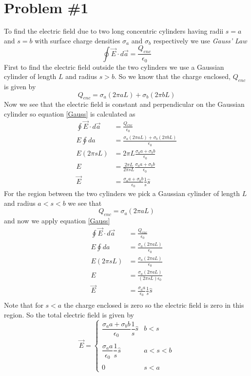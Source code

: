 \documentclass[11pt]{article}
\numberwithin{equation}{section}
\begin{document}


\section{Problem \#1}
To find the electric field due to two long concentric cylinders having radii $s=a$ and $s=b$ with surface charge densities $\sigma_a$ and $\sigma_b$ respectively we use \emph{Gauss' Law}
\begin{equation}
\oint\vec{E}\cdot d\vec{a} = \frac{Q_{enc}}{\epsilon_0}
\label{Gauss}
\end{equation}
First to find the electric field outside the two cylinders we use a Gaussian cylinder of length $L$ and radius $s>b$. So we know that the charge enclosed, $Q_{enc}$ is given by
$$Q_{enc} = \sigma_a(2\pi aL)+\sigma_b(2\pi bL)$$
Now we see that the electric field is constant and perpendicular on the Gaussian cylinder so equation \ref{Gauss} is calculated as
\begin{align*}
\oint\vec{E}\cdot d\vec{a} &= \frac{Q_{enc}}{\epsilon_0}\\
E\oint da &= \frac{\sigma_a(2\pi aL)+\sigma_b(2\pi bL)}{\epsilon_0}\\
E(2\pi sL) &= 2\pi L\frac{\sigma_aa+\sigma_bb}{\epsilon_0}\\
E &= \frac{2\pi L}{2\pi sL}\frac{\sigma_aa+\sigma_bb}{\epsilon_0}\\
\vec{E} &= \frac{\sigma_aa+\sigma_bb}{\epsilon_0}\frac{1}{s}\hat{s}
\end{align*}
For the region between the two cylinders we pick a Gaussian cylinder of length $L$ and radius $a<s<b$ we see that
$$Q_{enc} = \sigma_a(2\pi aL)$$
and now we apply equation \ref{Gauss}
\begin{align*}
\oint\vec{E}\cdot d\vec{a} &= \frac{Q_{enc}}{\epsilon_0}\\
E\oint da &= \frac{\sigma_a(2\pi aL)}{\epsilon_0}\\
E(2\pi sL) &= \frac{\sigma_a(2\pi aL)}{\epsilon_0}\\
E &= \frac{\sigma_a(2\pi aL)}{(2\pi sL)\epsilon_0}\\
\vec{E} &= \frac{\sigma_aa}{\epsilon_0}\frac{1}{s}\hat{s}\\
\end{align*}
Note that for $s<a$ the charge enclosed is zero so the electric field is zero in this region. So the total electric field is given by
$$\vec{E} = \left\{\begin{array}{lc}
	\dfrac{\sigma_aa+\sigma_bb}{\epsilon_0}\dfrac{1}{s}\hat{s}	&b<s\\
\\
	\dfrac{\sigma_aa}{\epsilon_0}\dfrac{1}{s}\hat{s}		&a<s<b\\
\\
	0								&s<a
		\end{array}\right.$$
\end{document}
